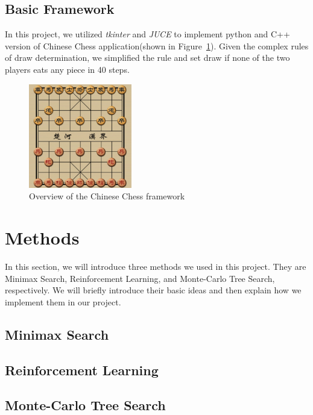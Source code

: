 \documentclass[letterpaper]{article}
\begin{document}
    \subsection{Basic Framework}\label{subsec:framework}
    In this project, we utilized \emph{tkinter} and \emph{JUCE} to implement python and C++ version of Chinese Chess application(shown in Figure~\ref{fig:figure}).
    Given the complex rules of draw determination, we simplified the rule and set draw if none of the two players eats any piece in 40 steps.
    \begin{figure}
        \centering
        \includegraphics[width=0.4\textwidth]{img/overview}
        \caption{Overview of the Chinese Chess framework}\label{fig:figure}
    \end{figure}
    \section{Methods}\label{sec:methods}

    In this section, we will introduce three methods we used in this project.
    They are Minimax Search, Reinforcement Learning, and Monte-Carlo Tree Search, respectively.
    We will briefly introduce their basic ideas and then explain how we implement them in our project.

    \subsection{Minimax Search}\label{subsec:minimax-search}
    

    \subsection{Reinforcement Learning}\label{subsec:reinforcement-learning}
    

    \subsection{Monte-Carlo Tree Search}
    \label{subsec:monte-carlo-tree-search}
    
\end{document}
